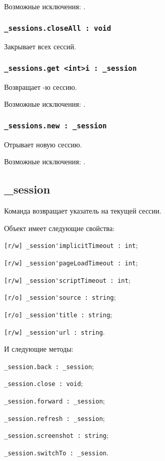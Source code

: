 Возможные исключения: .

\subsubsection{\lstinline|_sessions.closeAll : void|}

Закрывает всех сессий.

\subsubsection{\lstinline|_sessions.get <int>i : _session|}

Возвращает -ю сессию.

Возможные исключения: .

\subsubsection{\lstinline|_sessions.new : _session|}

Отрывает новую сессию.

Возможные исключения: .

\subsection{{\color{orange} \_session}}

Команда \session{} возвращает указатель на текущей сессии.

Объект \session{} имеет следующие свойства:
\begin{icItems}
	\item \lstinline|[r/w] _session'implicitTimeout : int|;
	\item \lstinline|[r/w] _session'pageLoadTimeout : int|;
	\item \lstinline|[r/w] _session'scriptTimeout : int|;
	\item \lstinline|[r/o] _session'source : string|;
	\item \lstinline|[r/o] _session'title : string|;
	\item \lstinline|[r/w] _session'url : string|.
\end{icItems}

И следующие методы:
\begin{icItems}
	\item \lstinline|_session.back : _session|;
	\item \lstinline|_session.close : void|;
	\item \lstinline|_session.forward : _session|;
	\item \lstinline|_session.refresh : _session|;
	\item \lstinline|_session.screenshot : string|;
	\item \lstinline|_session.switchTo : _session|.
\end{icItems}

